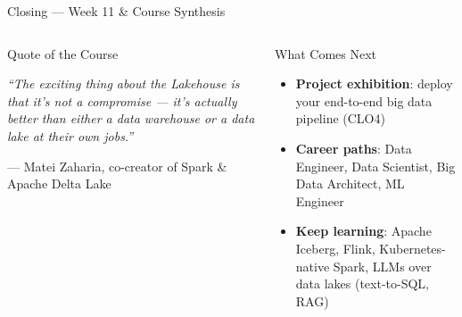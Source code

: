 \documentclass[aspectratio=169,10pt]{beamer}
\begin{document}
\begin{frame}{Closing — Week 11 \& Course Synthesis}
\begin{columns}[T]
      \begin{alertblock}{Quote of the Course}
        \begin{center}
        \large\itshape
        ``The exciting thing about the
        Lakehouse is that it's not a
        compromise --- it's actually better
        than either a data warehouse
        or a data lake at their own jobs.''
        \end{center}
        \begin{flushright}
        \small --- Matei Zaharia,
        co-creator of Spark \&\\
        \hspace*{2em}Apache Delta Lake
        \end{flushright}
      \end{alertblock}
      \vspace{6pt}
      \begin{exampleblock}{What Comes Next}
        \begin{itemize}\setlength\itemsep{1pt}
          \item \textbf{Project exhibition}: deploy your end-to-end
                big data pipeline (CLO4)
          \item \textbf{Career paths}: Data Engineer, Data Scientist,
                Big Data Architect, ML Engineer
          \item \textbf{Keep learning}: Apache Iceberg, Flink,
                Kubernetes-native Spark, LLMs over data lakes
                (text-to-SQL, RAG)
        \end{itemize}
      \end{exampleblock}
  \end{columns}
\end{frame}

\end{document}
